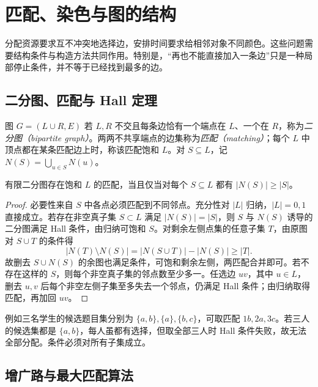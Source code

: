 \setcounter{chapter}{10} %
\chapter{匹配、染色与图的结构}
\label{ch:matching-coloring}

分配资源要求互不冲突地选择边，安排时间要求给相邻对象不同颜色。这些问题需要结构条件与构造方法共同作用。特别是，“再也不能直接加入一条边”只是一种局部停止条件，并不等于已经找到最多的边。

\section{二分图、匹配与 Hall 定理}

\begin{definition}
图 $G=(L\cup R,E)$ 若 $L,R$ 不交且每条边恰有一个端点在 $L$、一个在 $R$，称为\emph{二分图（bipartite graph）}。两两不共享端点的边集称为\emph{匹配（matching）}；每个 $L$ 中顶点都在某条匹配边上时，称该匹配饱和 $L$。对 $S\subseteq L$，记 $N(S)=\bigcup_{u\in S}N(u)$。
\end{definition}

\begin{theorem}
有限二分图存在饱和 $L$ 的匹配，当且仅当对每个 $S\subseteq L$ 都有 $|N(S)|\ge|S|$。
\end{theorem}
\begin{proof}
必要性来自 $S$ 中各点必须匹配到不同邻点。充分性对 $|L|$ 归纳，$|L|=0,1$ 直接成立。若存在非空真子集 $S\subset L$ 满足 $|N(S)|=|S|$，则 $S$ 与 $N(S)$ 诱导的二分图满足 Hall 条件，由归纳可饱和 $S$。对剩余左侧点集的任意子集 $T$，由原图对 $S\cup T$ 的条件得
\[
 |N(T)\setminus N(S)|=|N(S\cup T)|-|N(S)|\ge|T|.
\]
故删去 $S\cup N(S)$ 的余图也满足条件，可饱和剩余左侧，两匹配合并即可。若不存在这样的 $S$，则每个非空真子集的邻点数至少多一。任选边 $uv$，其中 $u\in L$，删去 $u,v$ 后每个非空左侧子集至多失去一个邻点，仍满足 Hall 条件；由归纳取得匹配，再加回 $uv$。
\end{proof}

例如三名学生的候选题目集分别为 $\{a,b\},\{a\},\{b,c\}$，可取匹配 $1b,2a,3c$。若三人的候选集都是 $\{a,b\}$，每人虽都有选择，但取全部三人时 Hall 条件失败，故无法全部分配。条件必须对所有子集成立。

\section{增广路与最大匹配算法}

